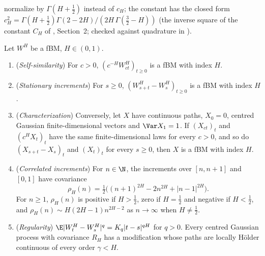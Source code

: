 \textcite{mandelbrot-van-ness-1968} normalize by $\Gamma(H+\frac12)$ instead of $c_H$; the constant has
the closed form $c_H^2=\Gamma(H+\frac12)\Gamma(2-2H)/(2H\,\Gamma(\frac32-H))$ (the inverse square of the
constant $C_H$ of \textcite{bayer-friz-gatheral-2016}, Section~2; checked against quadrature in
).

\begin{proposition}\label{prop:rv-fbm-properties}
Let $W^H$ be a fBM, $H\in(0,1)$.
\begin{enumerate}[label=(\roman*)]
  \item (\emph{Self-similarity}) For $c>0$, $(c^{-H}W^H_{ct})_{t\ge0}$ is a fBM with index $H$.
  \item (\emph{Stationary increments}) For $s\ge0$, $(W^H_{s+t}-W^H_s)_{t\ge0}$ is a fBM with index $H$.
  \item (\emph{Characterization}) Conversely, let $X$ have continuous paths, $X_0=0$, centred Gaussian
    finite-dimensional vectors and $\Var X_1=1$. If $(X_{ct})_t$ and $(c^HX_t)_t$ have the same
    finite-dimensional laws for every $c>0$, and so do $(X_{s+t}-X_s)_t$ and $(X_t)_t$ for every $s\ge0$,
    then $X$ is a fBM with index $H$.
  \item (\emph{Correlated increments}) For $n\in\N$, the increments over $[n,n+1]$ and $[0,1]$ have
    covariance
    \begin{equation}\label{eq:rv-fgn}
      \rho_H(n)=\tfrac12\big((n+1)^{2H}-2n^{2H}+|n-1|^{2H}\big).
    \end{equation}
    For $n\ge1$, $\rho_H(n)$ is positive if $H>\frac12$, zero if $H=\frac12$ and negative if $H<\frac12$, and
    $\rho_H(n)\sim H(2H-1)n^{2H-2}$ as $n\to\infty$ when $H\ne\frac12$.
  \item (\emph{Regularity}) $\E|W^H_t-W^H_s|^q=K_q|t-s|^{qH}$ for $q>0$. Every centred Gaussian process
    with covariance $R_H$ has a modification whose paths are locally H\"older continuous of every order
    $\gamma<H$.
\end{enumerate}
\end{proposition}

